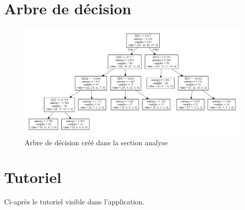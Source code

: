 \documentclass[a4paper, 11pt, titlepage]{article}
\begin{document}
    \begin{appendix}
    \newpage
    \section{Arbre de décision}
    \label{tree}
    \begin{figure}[ht!]
        \centering
        \includegraphics[scale=0.5, angle=90]{tree}
        \caption{Arbre de décision créé dans la section analyse}
    \end{figure}
    \newpage    
    \section{Tutoriel}
    Ci-après le tutoriel visible dans l'application.
    \begin{multicols}{2}

\end{multicols}
\end{appendix}
\end{document}
